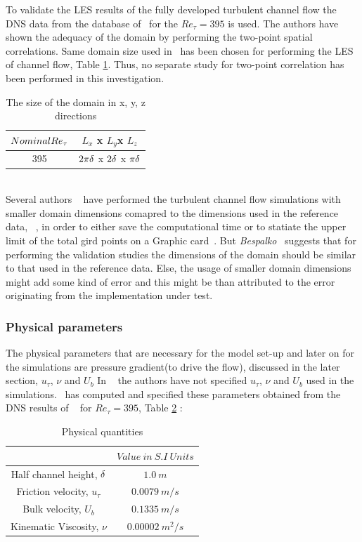 To validate the LES results of the fully developed turbulent channel flow the DNS data from the database of~\cite{moser:kim:mansour:99} for the $Re_\tau = 395$ is used. The authors have shown the adequacy of the domain by performing the two-point spatial correlations. Same domain size used in~\cite{moser:kim:mansour:99} has been chosen for performing the LES of channel flow, Table \ref{Computational Domain}. Thus, no separate study for two-point correlation has been performed in this investigation.
%
\begin{table}[!h]
\centering
\begin{tabular}{c|c}
\hline
$Nominal Re_{\tau}$ & $L_x$ x $L_y $x $L_z$ \\
\hline
%
395   &  $2\pi\delta$ x $2\delta$ x $\pi\delta$  \\
\hline
\end{tabular}
\caption{The size of the domain in x, y, z directions}
\label{Computational Domain}
\end{table}\\
%
Several authors ~\cite{Freitas:11, sonja:12} have performed the turbulent channel flow simulations with smaller domain dimensions comapred to the dimensions used in the reference data, ~\cite{moser:kim:mansour:99}, in order to either save the computational time or to statiate the upper limit of the total gird points on a Graphic card~\cite{sonja:12}. But \emph{Bespalko}~\cite{bespalko:11} suggests that for performing the validation studies the dimensions of the domain should be similar to that used in the reference data. Else, the usage of smaller domain dimensions might add some kind of error and this might be than attributed to the error originating from the implementation under test.

\subsubsection{Physical parameters}
The physical parameters that are necessary for the model set-up and later on for the simulations are pressure gradient(to drive the flow), discussed in the later section, $u_\tau$, $\nu$ and $U_b$
In ~\cite{moser:kim:mansour:99} the authors have not specified $u_\tau$, $\nu$ and $U_b$ used in the simulations.~\cite{devilliers:phd} has computed and specified these parameters obtained from the DNS results of ~\cite{moser:kim:mansour:99} for $Re_\tau = 395$, Table \ref{Physical quantities}  :

%
\begin{table}[!h]
\centering
\begin{tabular}{c|c}
$ $ & $Value\ in\ S.I\ Units$  \\
\hline
%
Half channel height, $\delta$ & $1.0\ m$  \\
\hline
%
Friction velocity, $u_\tau$ & $0.0079\ m/s$  \\
\hline
%
Bulk velocity, $U_b$ & $0.1335\ m/s$  \\
\hline
%
Kinematic Viscosity, $\nu$ & $0.00002\ m^2/s$  \\
\hline
%
\end{tabular}
\caption{Physical quantities}
\label{Physical quantities}
\end{table}
%
 
